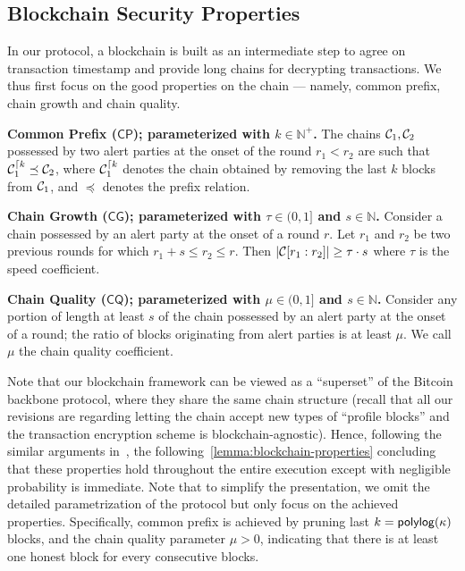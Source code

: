 \subsection{Blockchain Security Properties}
\label{subsec:blockchain-security-properties}

In our protocol, a blockchain is built as an intermediate step to agree on transaction timestamp and provide long chains for decrypting transactions.
%
We thus first focus on the good properties on the chain --- namely, common prefix, chain growth and chain quality.

\begin{cccItemize}[noitemsep]
	\item \textbf{Common Prefix ($\mathsf{CP}$); parameterized with $k \in \mathbb{N}^+$.}
	The chains $\mathcal{C}_1, \mathcal{C}_2$ possessed by two alert parties at the
	onset of the round $r_1 < r_2$ are such that $\mathcal{C}_1^{\lceil{k}} \preceq \mathcal{C}_2$, where $\mathcal{C}_1^{\lceil{k}}$ denotes the chain obtained by removing the last $k$ blocks from $\mathcal{C}_1$, and $\preceq$ denotes the prefix relation.

	\item \textbf{Chain Growth ($\mathsf{CG}$); parameterized with $\tau \in (0, 1]$ and $s \in \mathbb{N}$.}
	Consider a chain \chain possessed by an alert party at the onset of a round $r$. Let $r_1$ and $r_2$ be two previous rounds for which $r_1 + s \le r_2 \le r$.
	Then $|\mathcal{C}[r_1 : r_2]| \ge \tau \cdot s$ where $\tau$ is the speed coefficient.

	\item \textbf{Chain Quality ($\mathsf{CQ}$); parameterized with $\mu \in (0, 1]$ and $s \in \mathbb{N}$.}
	Consider any portion of length at least $s$ of the chain possessed by an alert party at the onset of a round; the ratio of blocks originating from alert parties is at least $\mu$. We call $\mu$ the chain quality coefficient.
\end{cccItemize}

Note that our blockchain framework can be viewed as a ``superset'' of the Bitcoin backbone protocol, where they share the same chain structure (recall that all our revisions are regarding letting the chain accept new types of ``profile blocks'' and the transaction encryption scheme is blockchain-agnostic).
%
Hence, following the similar arguments in~\cite{EC:GarKiaLeo15,EC:PasSeeash17,C:BMTZ17}, the following~\cref{lemma:blockchain-properties} concluding that these properties hold throughout the entire execution except with negligible probability is immediate.
%
Note that to simplify the presentation, we omit the detailed parametrization of the protocol but only focus on the achieved properties.
%
Specifically, common prefix is achieved by pruning last $k = \mathsf{polylog}(\kappa)$ blocks, and the chain quality parameter $\mu > 0$, indicating that there is at least one honest block for every \CPLen consecutive blocks.

